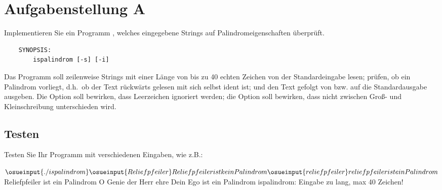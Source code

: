 




\section*{Aufgabenstellung A}

Implementieren Sie ein Programm , welches
eingegebene Strings auf Palindromeigenschaften überprüft.

\begin{verbatim}
    SYNOPSIS:
        ispalindrom [-s] [-i]
\end{verbatim}

Das Programm  soll zeilenweise Strings mit einer
Länge von bis zu 40 echten Zeichen von der Standardeingabe lesen;
prüfen, ob ein Palindrom vorliegt, d.h.\ ob der Text rückwärts gelesen
mit sich selbst ident ist; und den Text gefolgt von  bzw.  auf die Standardausgabe
ausgeben. Die Option  soll bewirken, dass Leerzeichen
ignoriert werden; die Option  soll bewirken, dass nicht
zwischen Groß- und Kleinschreibung unterschieden wird.

\subsection*{Testen}

Testen Sie Ihr Programm mit verschiedenen Eingaben, wie z.B.:

\begin{osuefmtcode}
      $ \osueinput{./ispalindrom}
      \osueinput{Reliefpfeiler}
      Reliefpfeiler ist kein Palindrom
      \osueinput{reliefpfeiler}
      reliefpfeiler ist ein Palindrom

      $ 
      Reliefpfeiler ist ein Palindrom
      O Genie der Herr ehre Dein Ego ist ein Palindrom
      ispalindrom: Eingabe zu lang, max 40 Zeichen!
\end{osuefmtcode}

\osueguidelinesone


